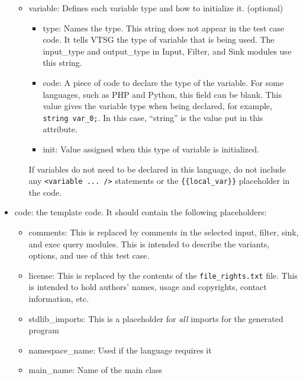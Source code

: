 \documentclass[12pt]{article}
\begin{document}
\begin{itemize}
\begin{itemize}
        \item variable: Defines each variable type and how to initialize it. (optional)
        \begin{itemize}
        \item type: Names the type. This string 
        does not appear in the test case code.  It tells VTSG
        the type of variable that is being used.  The input\_type
        and output\_type in Input, Filter, and Sink modules use
        this string.

        \item code: A piece of code to declare the type of the variable. For
        some languages, such as PHP and Python, this field can be blank. 
        This value gives the variable type when being declared, for example,
        \verb|string var_0;|.  In this case, ``string''
        is the value put in this attribute.

        \item init: Value assigned when this type of variable is initialized.
        \end{itemize}
        If variables do not need to be declared in this language, do not include
        any \verb|<variable ... />| statements or the \verb|{{local_var}}|
        placeholder in the code.
    \end{itemize}
    
    \item code: the template code. It should contain the 
    following placeholders:
    \begin{itemize}
        \item comments: This is replaced by comments in the selected input,
        filter, sink, and exec query modules.  This is intended to
        describe the variants, options, and use of this test case. 
        
        \item license: This is replaced by the contents of the
        \verb|file_rights.txt| file.  This is intended to hold
        authors' names, usage and copyrights, contact information, 
        etc.
        
        \item stdlib\_imports:  This is a placeholder for
        \emph{all} imports for the generated program

        \item namespace\_name:  Used if the language requires it

        \item main\_name:  Name of the main class


\end{itemize}
\end{itemize}
\end{document}
